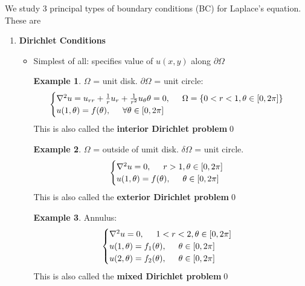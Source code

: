 \documentclass{book}
\theoremstyle{definition}
\newtheorem{exmp}{Example}[section]
\newcommand{\p}{\partial}
\newcommand{\f}[2]{\frac{#1}{#2}}
\begin{document}
	We study 3 principal types of boundary conditions (BC) for Laplace's equation. These are
	\begin{enumerate}
		\item \textbf{Dirichlet Conditions}
		\begin{itemize}
			\item Simplest of all: specifies value of $u(x,y)$ along $\p\Omega$
			\begin{exmp}
				$\Omega$ = unit disk. $\p \Omega$ = unit circle:
				\begin{align*}
				\begin{cases}
				\nabla^2 u = u_{rr} + \f{1}{r}u_r + \f{1}{r^2}u_\theta\theta = 0, \hspace{0.5cm} \Omega = \{0<r<1, \theta \in [0,2\pi]\}\\
				u(1,\theta) = f(\theta), \hspace{0.5cm} \forall \theta\in [0,2\pi]
				\end{cases}
				\end{align*}
				This is also called the \textbf{interior Dirichlet problem}\qed
			\end{exmp}
			\begin{exmp}
				$\Omega$ = outside of umit disk. $\delta \Omega$ = unit circle.
				\begin{align*}
				\begin{cases}
				\nabla^2 u =0,\hspace{0.5cm} r> 1, \theta \in [0,2\pi]\\
				u(1,\theta) = f(\theta), \hspace{0.5cm} \theta \in [0,2\pi]
				\end{cases}
				\end{align*}
				This is also called the \textbf{exterior Dirichlet problem}\qed
			\end{exmp}
			\begin{exmp}
				Annulus:
				\begin{align*}
				\begin{cases}
				\nabla^2 u =0,\hspace{0.5cm} 1 < r < 2, \theta \in [0,2\pi]\\
				u(1,\theta) = f_1(\theta), \hspace{0.5cm} \theta \in [0,2\pi]\\
				u(2,\theta) = f_2(\theta), \hspace{0.5cm} \theta \in [0,2\pi]\\
				\end{cases}
				\end{align*}
				This is also called the \textbf{mixed Dirichlet problem}\qed
			\end{exmp}
		\end{itemize}
	

\end{enumerate}
\end{document}
